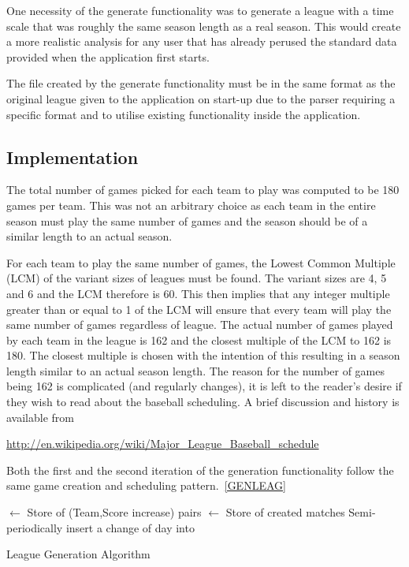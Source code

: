 One necessity of the generate functionality was to generate a league
with a time scale that was roughly the same season length as a real
season. This would create a more realistic analysis for any user that
has already perused the standard data provided when the application
first starts.

The file created by the generate functionality must be in the same
format as the original league given to the application on start-up due
to the parser requiring a specific format and to utilise existing
functionality inside the application.

\subsection{Implementation}
The total number of games picked for each team to play was computed to
be 180 games per team. This was not an arbitrary choice as each team
in the entire season must play the same number of games and the season
should be of a similar length to an actual season.

For each team to play the same number of games, the Lowest Common
Multiple (LCM) of the variant sizes of leagues must be found. The
variant sizes are 4, 5 and 6 and the LCM therefore is 60. This then
implies that any integer multiple greater than or equal to 1 of the
LCM will ensure that every team will play the same number of games
regardless of league. The actual number of games played by each team
in the league is 162 and the closest multiple of the LCM to 162 is 180.
The closest multiple is chosen with the intention of this resulting
in a season length similar to an actual season length. The reason for the number
of games being 162 is complicated (and regularly changes), it is left to the
reader's desire if they wish to read about the baseball scheduling. A brief
discussion and history is available from

\url{http://en.wikipedia.org/wiki/Major_League_Baseball_schedule}

Both the first and the second iteration of the generation
functionality follow the same game creation and scheduling
pattern.~\ref{GENLEAG}


\IncMargin{2em}
\begin{algorithm}
  \SetAlgoLined
   
   
   
   
  \fix $\leftarrow$ Store of (Team,Score increase) pairs\;
  \Fixtures $\leftarrow$ Store of created matches\;
    Semi-periodically insert a change of day into \Fixtures\;
    \BlankLine
    \caption{League Generation Algorithm}\label{GENLEAG}
  \end{algorithm} \DecMargin{2em}


